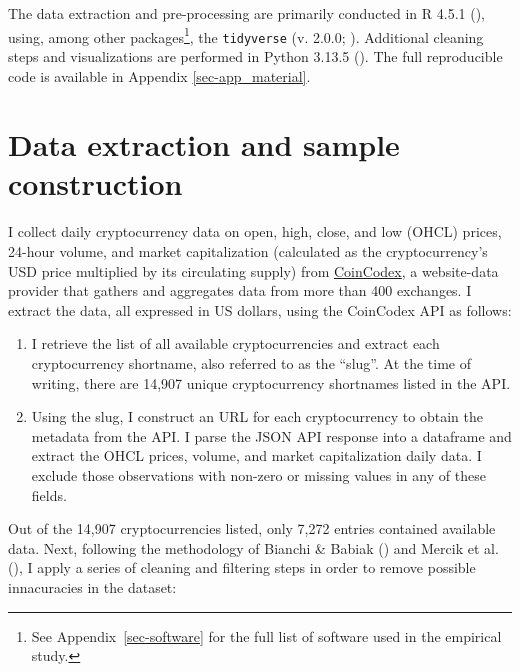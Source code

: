 \documentclass[
  12pt,
  a4paper,
  openany]{scrbook}
\begin{document}
The data extraction and pre-processing are primarily conducted in R
4.5.1 (), using, among other
packages\footnote{See Appendix~\ref{sec-software} for the full list of
  software used in the empirical study.}, the \texttt{tidyverse} (v.
2.0.0; ). Additional
cleaning steps and visualizations are performed in Python 3.13.5
(). The full
reproducible code is available in Appendix \ref{sec-app_material}.

\section{Data extraction and sample
construction}\label{data-extraction-and-sample-construction}

I collect daily cryptocurrency data on open, high, close, and low (OHCL)
prices, 24-hour volume, and market capitalization (calculated as the
cryptocurrency's USD price multiplied by its circulating supply) from
\href{https://coincodex.com/}{CoinCodex}, a website-data provider that
gathers and aggregates data from more than 400 exchanges. I extract the
data, all expressed in US dollars, using the CoinCodex API as follows:

\begin{enumerate}
\def\labelenumi{\arabic{enumi}.}
\item
  I retrieve the list of all available cryptocurrencies and extract each
  cryptocurrency shortname, also referred to as the ``slug''. At the
  time of writing, there are 14,907 unique cryptocurrency shortnames
  listed in the API.
\item
  Using the slug, I construct an URL for each cryptocurrency to obtain
  the metadata from the API. I parse the JSON API response into a
  dataframe and extract the OHCL prices, volume, and market
  capitalization daily data. I exclude those observations with non-zero
  or missing values in any of these fields.
\end{enumerate}

Out of the 14,907 cryptocurrencies listed, only 7,272 entries contained
available data. Next, following the methodology of Bianchi \& Babiak
() and Mercik
et al.
(),
I apply a series of cleaning and filtering steps in order to remove
possible innacuracies in the dataset:
\end{document}
